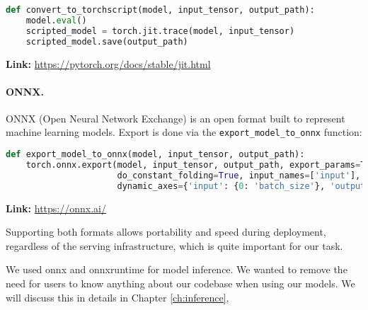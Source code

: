 \begin{lstlisting}[language=Python, caption={TorchScript conversion}, label=list:torchscript_export]
def convert_to_torchscript(model, input_tensor, output_path):
    model.eval()
    scripted_model = torch.jit.trace(model, input_tensor)
    scripted_model.save(output_path)
\end{lstlisting}

\textbf{Link:} \url{https://pytorch.org/docs/stable/jit.html}

\paragraph{ONNX.}
ONNX (Open Neural Network Exchange) is an open format built to represent machine learning models. Export is done via the \texttt{export\_model\_to\_onnx} function:

\begin{lstlisting}[language=Python, caption={ONNX export}, label=list:onnx_export]
def export_model_to_onnx(model, input_tensor, output_path):
    torch.onnx.export(model, input_tensor, output_path, export_params=True, opset_version=11,
                      do_constant_folding=True, input_names=['input'], output_names=['output'],
                      dynamic_axes={'input': {0: 'batch_size'}, 'output': {0: 'batch_size'}}
\end{lstlisting}

\textbf{Link:} \url{https://onnx.ai/}


Supporting both formats allows portability and speed during deployment, regardless of the serving infrastructure, which is quite important for our task.

We used onnx and onnxruntime for model inference. We wanted to remove the need for users to know anything about our codebase when using our models. We will discuss this in details in Chapter \ref{ch:inference},
